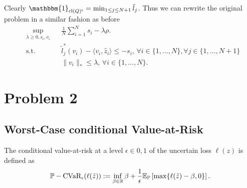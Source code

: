 \documentclass{scrartcl}
\renewcommand{\P}{\mathbb{P}}
\newcommand{\E}{\mathbb{E}}
\newcommand{\R}{\mathbb{R}}
\DeclareMathOperator*{\cl}{cl}
\newcommand{\cvar}{\textup{CVaR}}
\begin{document}
Clearly $\mathbbm{1}_{\cl(Q)^{\mathsf{c}}} = \min_{1\le j \le N+1} \tilde{l}_j$.
Thus we can rewrite the original problem in a similar fashion as before 
\begin{equation*}
  \begin{aligned}
    & \sup_{\lambda \ge 0, s_i,v_i} & & \frac{1}{N} \sum_{i=1}^N s_i - \lambda\rho. \\
    & \text{s.t.} & & \tilde{l}_j^*(v_i) - \langle {v_i, \hat{z}_i} \rangle \le - s_i, \, \forall i \in \{1,\dots,N\}, \forall j \in \{1,\dots,N+1\} \\
    & & & \lVert {v_i} \rVert_*\le\lambda , \, \forall i \in \{1,\dots,N\}.
  \end{aligned}
\end{equation*}



\section*{Problem 2}
\label{sec:problem_two}

\subsection*{Worst-Case conditional Value-at-Risk}
\label{sec:loss}
The conditional value-at-risk at a level $\epsilon \in 0,1$ of the uncertain
loss $\ell(z)$ is defined as
\begin{equation}
  \label{eq:cvar}
  \begin{aligned}
    \P-\cvar_{\epsilon}(\ell (\tilde{z})) := \inf_{\beta \in \R} \beta +\frac{1}{\epsilon} \E_{\P} \left[ \max\{\ell (\tilde{z}) - \beta, 0 \} \right].
  \end{aligned}
\end{equation}
\end{document}
